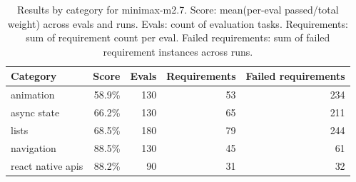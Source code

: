 \begin{table}[htbp]
\centering
\begin{tabular}{lrrrr}
\toprule
Category & Score & Evals & Requirements & Failed requirements \\
\midrule
animation & 58.9\% & 130 & 53 & 234 \\
async state & 66.2\% & 130 & 65 & 211 \\
lists & 68.5\% & 180 & 79 & 244 \\
navigation & 88.5\% & 130 & 45 & 61 \\
react native apis & 88.2\% & 90 & 31 & 32 \\
\bottomrule
\end{tabular}
\caption{Results by category for minimax-m2.7. Score: mean(per-eval passed/total weight) across evals and runs. Evals: count of evaluation tasks. Requirements: sum of requirement count per eval. Failed requirements: sum of failed requirement instances across runs.}
\end{table}
